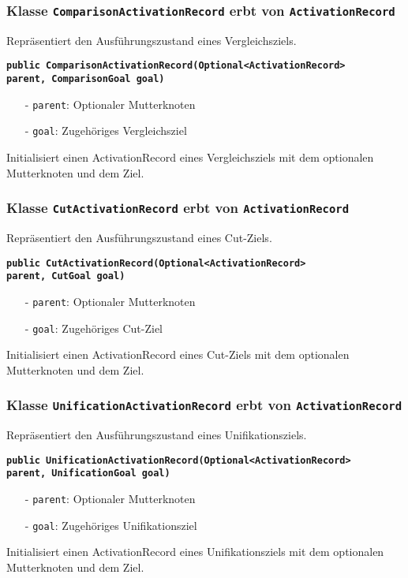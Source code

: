 \documentclass[parskip=full,11pt,twoside]{scrartcl}
\begin{document}
\subsubsection{Klasse \texttt{ComparisonActivationRecord} erbt von \texttt{ActivationRecord}}
Repräsentiert den Ausführungszustand eines Vergleichsziels.

\textbf{\texttt{public ComparisonActivationRecord(Optional<ActivationRecord>\\ parent, ComparisonGoal goal)}}
\begin{itemize}[noitemsep]
	\item[-] \texttt{parent}: Optionaler Mutterknoten
	\item[-] \texttt{goal}: Zugehöriges Vergleichsziel
\end{itemize}
Initialisiert einen ActivationRecord eines Vergleichsziels mit dem optionalen Mutterknoten und dem Ziel.

\subsubsection{Klasse \texttt{CutActivationRecord} erbt von \texttt{ActivationRecord}}
Repräsentiert den Ausführungszustand eines Cut-Ziels.

\textbf{\texttt{public CutActivationRecord(Optional<ActivationRecord>\\ parent, CutGoal goal)}}
\begin{itemize}[noitemsep]
	\item[-] \texttt{parent}: Optionaler Mutterknoten
	\item[-] \texttt{goal}: Zugehöriges Cut-Ziel
\end{itemize}
Initialisiert einen ActivationRecord eines Cut-Ziels mit dem optionalen Mutterknoten und dem Ziel.

\subsubsection{Klasse \texttt{UnificationActivationRecord} erbt von \texttt{ActivationRecord}}
Repräsentiert den Ausführungszustand eines Unifikationsziels.

\textbf{\texttt{public UnificationActivationRecord(Optional<ActivationRecord>\\ parent, UnificationGoal goal)}}
\begin{itemize}[noitemsep]
	\item[-] \texttt{parent}: Optionaler Mutterknoten
	\item[-] \texttt{goal}: Zugehöriges Unifikationsziel
\end{itemize}
Initialisiert einen ActivationRecord eines Unifikationsziels mit dem optionalen Mutterknoten und dem Ziel.
\end{document}
